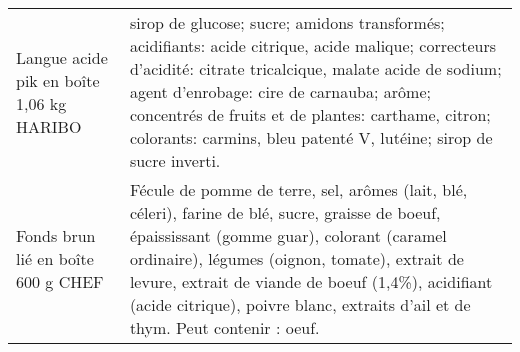 \begin{longtable}{p{5cm}p{10cm}}
                                                                 Langue acide pik en boîte 1,06 kg HARIBO &                                                                                                                                                                                                                                                                                                                                                                                                                                                                                                                                                                                                                                                                                                      sirop de glucose; sucre; amidons transformés; acidifiants: acide citrique, acide malique; correcteurs d'acidité: citrate tricalcique, malate acide de sodium; agent d'enrobage: cire de carnauba; arôme; concentrés de fruits et de plantes: carthame, citron; colorants: carmins, bleu patenté V, lutéine; sirop de sucre inverti. \\
                                                                       Fonds brun lié en boîte 600 g CHEF &                                                                                                                                                                                                                                                                                                                                                                                                                                                                                                                                                                                                                                                                                                 Fécule de pomme de terre, sel, arômes (lait, blé, céleri), farine de blé, sucre, graisse de boeuf, épaississant (gomme guar), colorant (caramel ordinaire), légumes (oignon, tomate), extrait de levure, extrait de viande de boeuf (1,4\%), acidifiant (acide citrique), poivre blanc, extraits d'ail et de thym.  Peut contenir : oeuf. \\

\end{longtable}
